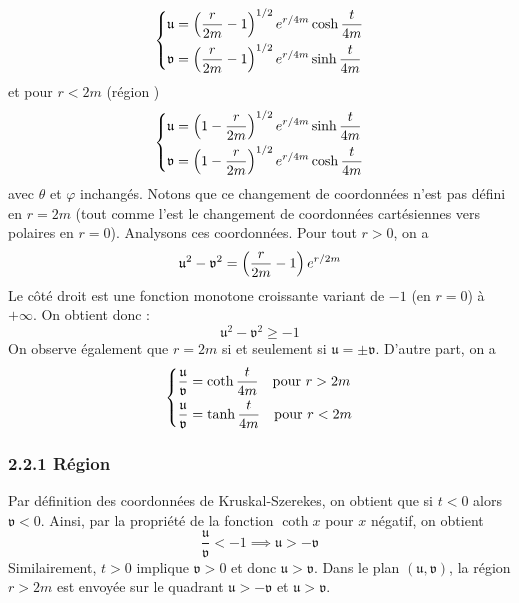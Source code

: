 \begin{align}
    \label{coordonnées KS 1}
    \begin{dcases}
        \mathfrak{u} = \left( \frac{r}{2m} -1 \right)^{1/2} e^{r/4m} \cosh \frac{t}{4m}\\
        \mathfrak{v} = \left( \frac{r}{2m} -1 \right)^{1/2} e^{r/4m} \sinh \frac{t}{4m}
    \end{dcases}
\end{align}
et pour $r<2m$ (région )
\begin{align}
    \label{coordonnées KS 2}
    \begin{dcases}
        \mathfrak{u} = \left( 1 - \frac{r}{2m} \right)^{1/2} e^{r/4m} \sinh \frac{t}{4m}\\
        \mathfrak{v} = \left( 1 - \frac{r}{2m}\right)^{1/2} e^{r/4m} \cosh \frac{t}{4m}
    \end{dcases}
\end{align}
avec $\theta$ et $\varphi$ inchangés. Notons que ce changement de coordonnées n'est pas défini en $r=2m$ (tout comme l'est le changement de coordonnées cartésiennes vers polaires en $r=0$). Analysons ces coordonnées. Pour tout $r>0$, on a
\begin{equation}
    \label{coordonnées KS 3}
    \mathfrak{u}^2 - \mathfrak{v}^2 = \left( \frac{r}{2m} - 1 \right) e^{r/2m}
\end{equation}
Le côté droit est une fonction monotone croissante variant de $-1$ (en $r=0$) à $+\infty$. On obtient donc :
\begin{equation}
    \boxed{\mathfrak{u}^2 -\mathfrak{v}^2 \geq -1}
\end{equation}
On observe également que $r=2m$ si et seulement si $\mathfrak{u} = \pm \mathfrak{v}$. D'autre part, on a 
\begin{equation}
    \label{coordonnées KS 4}
    \begin{dcases}
        \frac{\mathfrak{u}}{\mathfrak{v}} = \coth \frac{t}{4m} \quad \text{pour } r>2m \\
        \frac{\mathfrak{u}}{\mathfrak{v}} = \tanh \frac{t}{4m} \quad \text{pour } r<2m
    \end{dcases}
\end{equation}
\subsubsection{2.2.1 Région }
Par définition des coordonnées de Kruskal-Szerekes, on obtient que si $t<0$ alors $\mathfrak{v}<0$. Ainsi, par la propriété de la fonction $\coth x$ pour $x$ négatif, on obtient
\begin{equation}
    \frac{\mathfrak{u}}{\mathfrak{v}} < -1 \implies \mathfrak{u} > - \mathfrak{v}
\end{equation}
Similairement, $t>0$ implique $\mathfrak{v}>0$ et donc $\mathfrak{u}>\mathfrak{v}$. Dans le plan $(\mathfrak{u},\mathfrak{v})$, la région $r>2m$ est envoyée sur le quadrant $\mathfrak{u} > - \mathfrak{v}$ et $\mathfrak{u} > \mathfrak{v}$.

